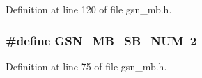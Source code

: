 Definition at line 120 of file gsn\_\-mb.h.

\hypertarget{a00525_aee0412ec5b5a95e91d984eadc705156e}{
\subsubsection[{GSN\_\-MB\_\-SB\_\-NUM}]{\setlength{\rightskip}{0pt plus 5cm}\#define GSN\_\-MB\_\-SB\_\-NUM~2}}
\label{a00525_aee0412ec5b5a95e91d984eadc705156e}


Definition at line 75 of file gsn\_\-mb.h.

